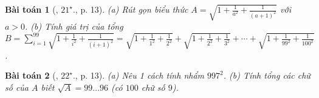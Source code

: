 \documentclass{article}
\newtheorem{baitoan}{Bài toán}
\begin{document}
\begin{baitoan}[\cite{Binh_Toan_9_tap_1}, $21^\star$., p. 13]
	(a) Rút gọn biểu thức $A = \sqrt{1 + \frac{1}{a^2} + \frac{1}{(a + 1)^2}}$ với $a > 0$. (b) Tính giá trị của tổng $B = \sum_{i=1}^{99} \sqrt{1 + \frac{1}{i^2} + \frac{1}{(i + 1)^2}} = \sqrt{1 + \frac{1}{1^2} + \frac{1}{2^2}} + \sqrt{1 + \frac{1}{2^2} + \frac{1}{3^2}} + \cdots + \sqrt{1 + \frac{1}{99^2} + \frac{1}{100^2}}$.
\end{baitoan}

\begin{baitoan}[\cite{Binh_Toan_9_tap_1}, $22^\star$., p. 13]
	(a) Nêu 1 cách tính nhẩm $997^2$. (b) Tính tổng các chữ số của $A$ biết $\sqrt{A} = 99\ldots96$ (có $100$ chữ số $9$).
\end{baitoan}


\printbibliography[heading=bibintoc]
	
\end{document}
